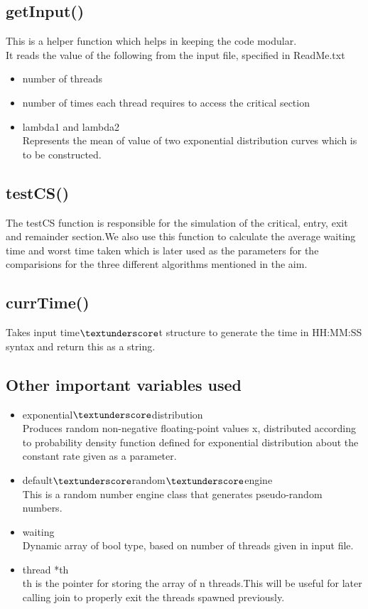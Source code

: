 \documentclass[12pt]{article}
\begin{document}
\subsection{getInput()}
This is a helper function which helps in keeping the code modular.\\
It reads the value of the following from the input file, specified in ReadMe.txt \\
\begin{itemize}
\item number of threads\\
\item number of times each thread requires to access the critical section\\
\item lambda1 and lambda2\\
Represents the mean of value of two exponential distribution curves which is to be constructed.
\end{itemize}

\subsection{testCS()}
The testCS function is responsible for the simulation of the critical, entry, exit and remainder section.We also use this function to calculate the average waiting time and worst time taken which is later used as the parameters for the comparisions for the three different algorithms mentioned in the aim.

\subsection{currTime()}
Takes input time$\textunderscore$t structure to generate the time in HH:MM:SS syntax and return this as a string.

\subsection{Other important variables used}
\begin{itemize}
\item exponential$\textunderscore$distribution\\
Produces random non-negative floating-point values x, distributed according to probability density function defined for exponential distribution about the constant rate given as a parameter.
\item default$\textunderscore$random$\textunderscore$engine\\
This is a random number engine class that generates pseudo-random numbers.
\item waiting\\
Dynamic array of bool type, based on number of threads given in input file.
\item thread *th\\
th is the pointer for storing the array of n threads.This will be useful for later calling join to properly exit the threads spawned previously.
\end{itemize}
\end{document}
